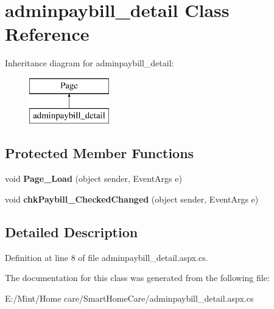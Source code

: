 \hypertarget{classadminpaybill__detail}{\section{adminpaybill\-\_\-detail Class Reference}
\label{classadminpaybill__detail}
}
Inheritance diagram for adminpaybill\-\_\-detail\-:\begin{figure}[H]
\begin{center}
\leavevmode
\includegraphics[height=2.000000cm]{classadminpaybill__detail}
\end{center}
\end{figure}
\subsection*{Protected Member Functions}
\begin{DoxyCompactItemize}
\item 
\hypertarget{classadminpaybill__detail_acf372407b84cc070e8fd6efb18cbbcbc}{void {\bfseries Page\-\_\-\-Load} (object sender, Event\-Args e)}\label{classadminpaybill__detail_acf372407b84cc070e8fd6efb18cbbcbc}

\item 
\hypertarget{classadminpaybill__detail_ab2fb914876175622f3f461bcd69003c2}{void {\bfseries chk\-Paybill\-\_\-\-Checked\-Changed} (object sender, Event\-Args e)}\label{classadminpaybill__detail_ab2fb914876175622f3f461bcd69003c2}

\end{DoxyCompactItemize}


\subsection{Detailed Description}


Definition at line 8 of file adminpaybill\-\_\-detail.\-aspx.\-cs.



The documentation for this class was generated from the following file\-:\begin{DoxyCompactItemize}
\item 
E\-:/\-Mint/\-Home care/\-Smart\-Home\-Care/adminpaybill\-\_\-detail.\-aspx.\-cs\end{DoxyCompactItemize}
